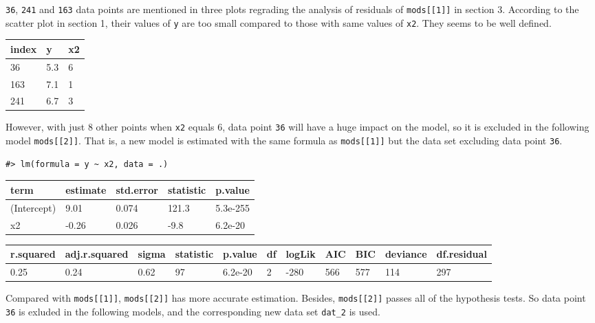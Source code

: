 \documentclass[main.tex]{subfiles}
\begin{document}
\texttt{36}, \texttt{241} and \texttt{163} data points are mentioned in
three plots regrading the analysis of residuals of
\texttt{mods{[}{[}1{]}{]}} in section 3. According to the scatter plot
in section 1, their values of \texttt{y} are too small compared to those
with same values of \texttt{x2}. They seems to be well defined.

\begin{table}[H]
\centering
\begin{tabular}{lll}
\toprule
index & y & x2\\
\midrule
36 & 5.3 & 6\\
163 & 7.1 & 1\\
241 & 6.7 & 3\\
\bottomrule
\end{tabular}
\end{table}

However, with just 8 other points when \texttt{x2} equals 6, data point
\texttt{36} will have a huge impact on the model, so it is excluded in
the following model \texttt{mods{[}{[}2{]}{]}}. That is, a new model is
estimated with the same formula as \texttt{mods{[}{[}1{]}{]}} but the
data set excluding data point \texttt{36}.

\begin{verbatim}
#> lm(formula = y ~ x2, data = .)
\end{verbatim}

\begin{table}[H]
\centering
\begin{tabular}{lllll}
\toprule
term & estimate & std.error & statistic & p.value\\
\midrule
(Intercept) & 9.01 & 0.074 & 121.3 & 5.3e-255\\
x2 & -0.26 & 0.026 & -9.8 & 6.2e-20\\
\bottomrule
\end{tabular}
\end{table}

\begin{table}[H]
\centering
\begin{tabular}{lllllllllll}
\toprule
r.squared & adj.r.squared & sigma & statistic & p.value & df & logLik & AIC & BIC & deviance & df.residual\\
\midrule
0.25 & 0.24 & 0.62 & 97 & 6.2e-20 & 2 & -280 & 566 & 577 & 114 & 297\\
\bottomrule
\end{tabular}
\end{table}

Compared with \texttt{mods{[}{[}1{]}{]}}, \texttt{mods{[}{[}2{]}{]}} has
more accurate estimation. Besides, \texttt{mods{[}{[}2{]}{]}} passes all
of the hypothesis tests. So data point \texttt{36} is exluded in the
following models, and the corresponding new data set \texttt{dat\_2} is
used.
\end{document}
